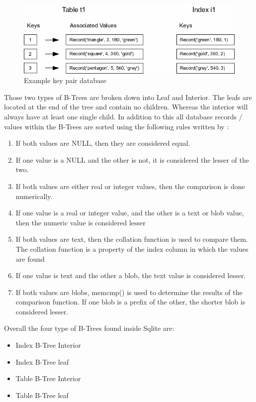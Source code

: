 \begin{figure}[H]
	\centering
	\includegraphics[scale=0.5]{images/examplepop.png}
	\caption{Example key pair database \citep{sqliteray}}
	\label{fig:sqlite_key_pair}
\end{figure}

Those two types of B-Trees are broken down into Leaf and Interior. The leafs are located at the end of the tree and contain no children. Whereas the interior will always have at least one single child. In addition to this all database records / values within the B-Trees are sorted using the following rules written by \cite{sqliteray}:

\begin{enumerate} 
	\item If both values are NULL, then they are considered equal.
	\item If one value is a NULL and the other is not, it is considered the lesser of the two.
	\item If both values are either real or integer values, then the comparison is done numerically.
	\item If one value is a real or integer value, and the other is a text or blob value, then the numeric value is considered lesser
	\item If both values are text, then the collation function is used to compare them. The collation function is a property of the index column in which the values are found
	\item If one value is text and the other a blob, the text value is considered lesser.
	\item If both values are blobs, memcmp() is used to determine the results of the comparison function. If one blob is a prefix of the other, the shorter blob is considered lesser.
\end{enumerate}  

Overall the four type of B-Trees found inside Sqlite are:

\begin{itemize} 
	\item Index B-Tree Interior
	\item Index B-Tree leaf
	\item Table B-Tree Interior
	\item Table B-Tree leaf 
\end{itemize} 


